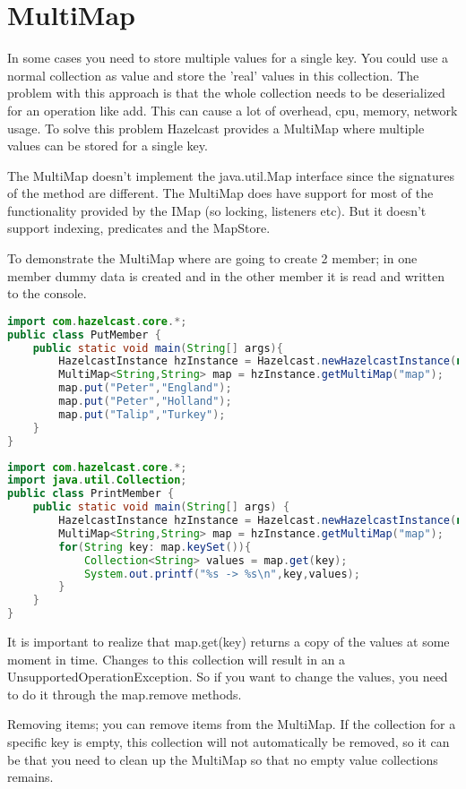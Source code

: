 \section{MultiMap}
In some cases you need to store multiple values for a single key. You could use a normal collection as value and store the 'real' values in this collection. The problem with this approach is that the whole collection needs to be deserialized for an operation like add. This can cause a lot of overhead, cpu, memory, network usage. To solve this problem Hazelcast provides a MultiMap where multiple values can be stored for a single key. 

The MultiMap doesn't implement the java.util.Map interface since the signatures of the method are different. The MultiMap does have support for most of the functionality provided by the IMap (so locking, listeners etc). But it doesn't support indexing, predicates and the MapStore.

To demonstrate the MultiMap where are going to create 2 member; in one member dummy data is created and in the other member it is read and written to the console.
\begin{lstlisting}[language=java]
import com.hazelcast.core.*;
public class PutMember {
    public static void main(String[] args){
        HazelcastInstance hzInstance = Hazelcast.newHazelcastInstance(null);
        MultiMap<String,String> map = hzInstance.getMultiMap("map");
        map.put("Peter","England");
        map.put("Peter","Holland");
        map.put("Talip","Turkey");
    }
}
\end{lstlisting}

\begin{lstlisting}[language=java]
import com.hazelcast.core.*;
import java.util.Collection;
public class PrintMember {
    public static void main(String[] args) {
        HazelcastInstance hzInstance = Hazelcast.newHazelcastInstance(null);
        MultiMap<String,String> map = hzInstance.getMultiMap("map");
        for(String key: map.keySet()){
            Collection<String> values = map.get(key);
            System.out.printf("%s -> %s\n",key,values);
        }
    }
}
\end{lstlisting}
It is important to realize that map.get(key) returns a copy of the values at some moment in time. Changes to this collection will result in an a UnsupportedOperationException. So if you want to change the values, you need to do it through the map.remove methods.

Removing items; you can remove items from the MultiMap. If the collection for a specific key is empty, this collection will not automatically be removed, so it can be that you need to clean up the MultiMap so that no empty value collections remains.

